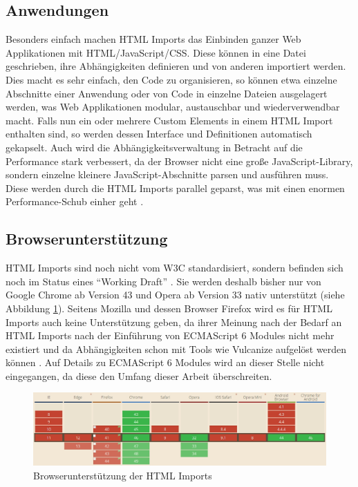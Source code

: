 \subsection{Anwendungen}\label{anwendungen}

Besonders einfach machen HTML Imports das Einbinden ganzer Web Applikationen mit HTML/JavaScript/CSS. Diese können in eine Datei geschrieben, ihre Abhängigkeiten definieren und von anderen importiert werden. Dies macht es sehr einfach, den Code zu organisieren, so können etwa einzelne Abschnitte einer Anwendung oder von Code in einzelne Dateien ausgelagert werden, was Web Applikationen modular, austauschbar und wiederverwendbar macht. Falls nun ein oder mehrere Custom Elements in einem HTML Import enthalten sind, so werden dessen Interface und Definitionen automatisch gekapselt. Auch wird die Abhängigkeitsverwaltung in Betracht auf die Performance stark verbessert, da der Browser nicht eine große JavaScript-Library, sondern einzelne kleinere JavaScript-Abschnitte parsen und ausführen muss. Diese werden durch die HTML Imports parallel geparst, was mit einen enormen Performance-Schub einher geht \cite{citeulike:13853647}.


\subsection{Browserunterstützung}\label{browserunterstuxfctzung}

HTML Imports sind noch nicht vom W3C standardisiert, sondern befinden sich noch im Status eines ``Working Draft'' \cite{citeulike:13853711}. Sie werden deshalb bisher nur von Google Chrome ab Version 43 und Opera ab Version 33 nativ unterstützt (siehe Abbildung \ref{fig:bdhtmli}). Seitens Mozilla und dessen Browser Firefox wird es für HTML Imports auch keine Unterstützung geben, da ihrer Meinung nach der Bedarf an HTML Imports nach der Einführung von ECMAScript 6 Modules nicht mehr existiert und da Abhängigkeiten schon mit Tools wie Vulcanize aufgelöst werden können \cite{citeulike:13881144}. Auf Details zu ECMAScript 6 Modules wird an dieser Stelle nicht eingegangen, da diese den Umfang dieser Arbeit überschreiten.

\begin{figure}[htbp]
 \centering
 \includegraphics[width=\linewidth]{kapitel2/bilder/5-html-imports-browserunterstuetzung}
 \caption{Browserunterstützung der HTML Imports}
 \label{fig:bdhtmli}
\end{figure}
